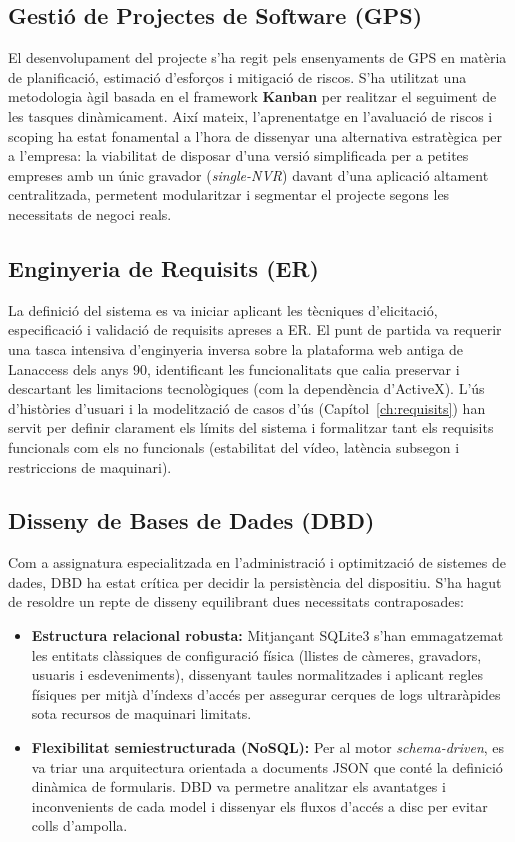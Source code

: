 \subsection{Gestió de Projectes de Software (GPS)}
El desenvolupament del projecte s'ha regit pels ensenyaments de GPS en matèria de planificació, estimació d'esforços i mitigació de riscos. S'ha utilitzat una metodologia àgil basada en el framework \textbf{Kanban} per realitzar el seguiment de les tasques dinàmicament. Així mateix, l'aprenentatge en l'avaluació de riscos i scoping ha estat fonamental a l'hora de dissenyar una alternativa estratègica per a l'empresa: la viabilitat de disposar d'una versió simplificada per a petites empreses amb un únic gravador (\textit{single-NVR}) davant d'una aplicació altament centralitzada, permetent modularitzar i segmentar el projecte segons les necessitats de negoci reals.

\subsection{Enginyeria de Requisits (ER)}
La definició del sistema es va iniciar aplicant les tècniques d'elicitació, especificació i validació de requisits apreses a ER. El punt de partida va requerir una tasca intensiva d'enginyeria inversa sobre la plataforma web antiga de Lanaccess dels anys 90, identificant les funcionalitats que calia preservar i descartant les limitacions tecnològiques (com la dependència d'ActiveX). L'ús d'històries d'usuari i la modelització de casos d'ús (Capítol~\ref{ch:requisits}) han servit per definir clarament els límits del sistema i formalitzar tant els requisits funcionals com els no funcionals (estabilitat del vídeo, latència subsegon i restriccions de maquinari).

\subsection{Disseny de Bases de Dades (DBD)}
Com a assignatura especialitzada en l'administració i optimització de sistemes de dades, DBD ha estat crítica per decidir la persistència del dispositiu. S'ha hagut de resoldre un repte de disseny equilibrant dues necessitats contraposades:
\begin{itemize}
  \item \textbf{Estructura relacional robusta:} Mitjançant SQLite3 s'han emmagatzemat les entitats clàssiques de configuració física (llistes de càmeres, gravadors, usuaris i esdeveniments), dissenyant taules normalitzades i aplicant regles físiques per mitjà d'índexs d'accés per assegurar cerques de logs ultraràpides sota recursos de maquinari limitats.
  \item \textbf{Flexibilitat semiestructurada (NoSQL):} Per al motor \textit{schema-driven}, es va triar una arquitectura orientada a documents JSON que conté la definició dinàmica de formularis. DBD va permetre analitzar els avantatges i inconvenients de cada model i dissenyar els fluxos d'accés a disc per evitar colls d'ampolla.
\end{itemize}

